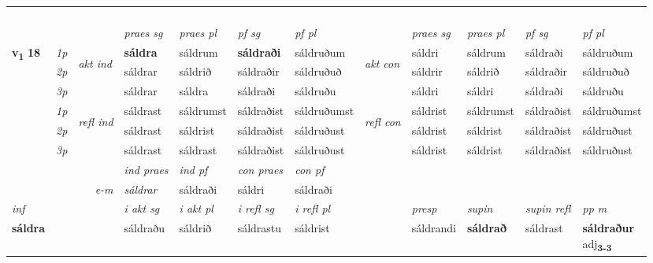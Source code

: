 \begin{longtable}[l]{X>{\footnotesize\itshape}llXXXXlXXXX}
\midrule
& \\*
 & \\*
   & \\*
  & \\
   \midrule
 & &   & \textit{praes sg}  & \textit{praes pl}    & \textit{ pf sg} & \textit{pf pl} & & \textit{praes sg}  & \textit{praes pl}    & \textit{pf sg} & \textit{pf pl }  \\ \cmidrule{4-7} \cmidrule{9-12}
 \multirow{2}{*}{{{\textbf{v{\textsubscript{1}}} \Large{\textbf{18}}}}}  & 1p & \multirow{3}{*}{\begin{turn}{90}\textit{akt ind}\end{turn}} & \textbf{sáldra} & sáldrum & \textbf{sáldraði} & sáldruðum & \multirow{3}{*}{\begin{turn}{90}\textit{akt con}\end{turn}} &sáldri & sáldrum & sáldraði & sáldruðum\\*
 & 2p &  &  sáldrar  & sáldrið & sáldraðir & sáldruðuð & & sáldrir & sáldrið & sáldraðir & sáldruðuð \\*
 & 3p &  & sáldrar & sáldra & sáldraði & sáldruðu & & sáldri & sáldri& sáldraði & sáldruðu \\*
\cmidrule{4-7} \cmidrule{9-12}
 & 1p & \multirow{3}{*}{\begin{turn}{90}\textit{refl ind}\end{turn}}  & sáldrast & sáldrumst & sáldraðist & sáldruðumst & \multirow{3}{*}{\begin{turn}{90}\textit{refl con}\end{turn}}  &sáldrist & sáldrumst & sáldraðist & sáldruðumst \\*
 & 2p &  & sáldrast & sáldrist & sáldraðist & sáldruðust & &sáldrist & sáldrist & sáldraðist & sáldruðust \\*
 & 3p  & & sáldrast & sáldrast & sáldraðist & sáldruðust & & sáldrist & sáldrist& sáldraðist & sáldruðust \\*
\cmidrule{4-7} \cmidrule{9-12}

   && &  \textit{ind praes} & \textit{ind pf} & \textit{con praes} & \textit{con pf} \\*
\multicolumn{3}{r}{\textit{e-m}} & sáldrar & sáldraði & sáldri & sáldraði \\*

\cmidrule{4-7}
   {\textit{inf}} & &  & \textit{i akt sg} & \textit{i akt pl} & \textit{i refl sg} & \textit{i refl pl} && \textit{presp} & \textit{supin} & \textit{supin refl} & \textit{pp m} \\*
  {\textbf{sáldra}} & && sáldraðu  & sáldrið & sáldrastu & sáldrist && sáldrandi &  \textbf{sáldrað} & sáldrast & \specialcell{\textbf{sáldraður} \\ adj\textbf{\textsubscript{3-3}}} \\*


\end{longtable}
